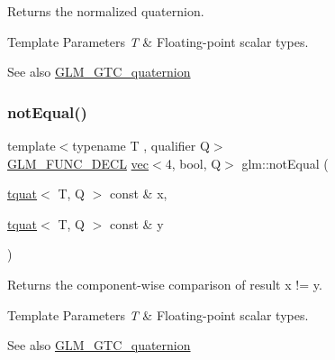 Returns the normalized quaternion.


\begin{DoxyTemplParams}{Template Parameters}
{\em T} & Floating-\/point scalar types.\\
\hline
\end{DoxyTemplParams}
\begin{DoxySeeAlso}{See also}
\mbox{\hyperlink{group__gtc__quaternion}{G\+L\+M\+\_\+\+G\+T\+C\+\_\+quaternion}} 
\end{DoxySeeAlso}
\mbox{\label{group__gtc__quaternion_ga9494ec3489041958a240963a8a0ac9a0}} 
\subsubsection{\texorpdfstring{not\+Equal()}{notEqual()}}
{\footnotesize\ttfamily template$<$typename T , qualifier Q$>$ \\
\mbox{\hyperlink{setup_8hpp_ab2d052de21a70539923e9bcbf6e83a51}{G\+L\+M\+\_\+\+F\+U\+N\+C\+\_\+\+D\+E\+CL}} \mbox{\hyperlink{structglm_1_1vec}{vec}}$<$4, bool, Q$>$ glm\+::not\+Equal (\begin{DoxyParamCaption}\item[{\mbox{\hyperlink{structglm_1_1tquat}{tquat}}$<$ T, Q $>$ const \&}]{x,  }\item[{\mbox{\hyperlink{structglm_1_1tquat}{tquat}}$<$ T, Q $>$ const \&}]{y }\end{DoxyParamCaption})}

Returns the component-\/wise comparison of result x != y.


\begin{DoxyTemplParams}{Template Parameters}
{\em T} & Floating-\/point scalar types.\\
\hline
\end{DoxyTemplParams}
\begin{DoxySeeAlso}{See also}
\mbox{\hyperlink{group__gtc__quaternion}{G\+L\+M\+\_\+\+G\+T\+C\+\_\+quaternion}} 
\end{DoxySeeAlso}
\mbox{\label{group__gtc__quaternion_ga82de7204717a61a57d1bd321902bb9c6}} 

